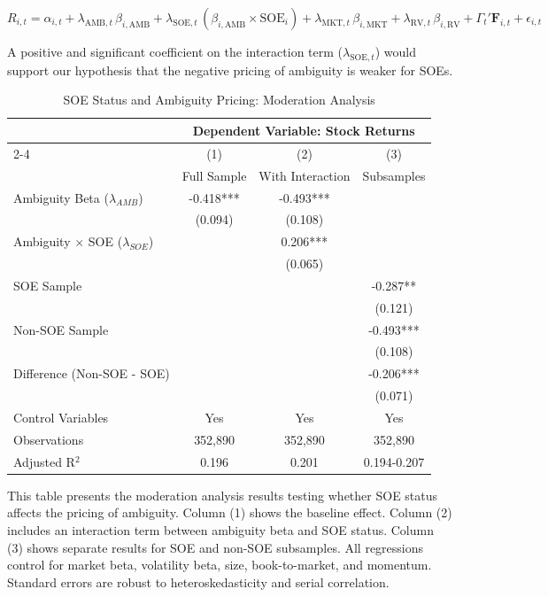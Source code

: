 \documentclass[preprint,12pt,authoryear]{elsarticle}
\begin{document}
\begin{equation}
R_{i,t} = \alpha_{i,t} + \lambda_{\text{AMB},t} \, \beta_{i,\text{AMB}} + \lambda_{\text{SOE},t} \, (\beta_{i,\text{AMB}} \times \text{SOE}_i) + \lambda_{\text{MKT},t} \, \beta_{i,\text{MKT}} + \lambda_{\text{RV},t} \, \beta_{i,\text{RV}} + \Gamma_{t}' \mathbf{F}_{i,t} + \epsilon_{i,t}
\end{equation}

A positive and significant coefficient on the interaction term ($\lambda_{\text{SOE},t}$) would support our hypothesis that the negative pricing of ambiguity is weaker for SOEs.

\begin{table}[htbp]
\centering
\caption{SOE Status and Ambiguity Pricing: Moderation Analysis}
\label{tab:soe_moderation}
\begin{threeparttable}
\begin{tabular*}{\textwidth}{@{\extracolsep{\fill}} lccc @{\extracolsep{\fill}}}
\toprule
& \multicolumn{3}{c}{Dependent Variable: Stock Returns} \\
\cmidrule(lr){2-4}
& (1) & (2) & (3) \\
& Full Sample & With Interaction & Subsamples \\
\midrule
\midrule
Ambiguity Beta ($\lambda_{AMB}$) & -0.418*** & -0.493*** &  \\
& (0.094) & (0.108) &  \\
\midrule
Ambiguity $\times$ SOE ($\lambda_{SOE}$) & & 0.206*** &  \\
& & (0.065) &  \\
\midrule
SOE Sample & & & -0.287** \\
& & & (0.121) \\
\midrule
Non-SOE Sample & & & -0.493*** \\
& & & (0.108) \\
\midrule
Difference (Non-SOE - SOE) & & & -0.206*** \\
& & & (0.071) \\
\midrule
Control Variables & Yes & Yes & Yes \\
\midrule
Observations & 352,890 & 352,890 & 352,890 \\
Adjusted R$^2$ & 0.196 & 0.201 & 0.194-0.207 \\
\bottomrule
\end{tabular*}
\begin{tablenotes}[flushleft]
\small
\item[] This table presents the moderation analysis results testing whether SOE status affects the pricing of ambiguity. Column (1) shows the baseline effect. Column (2) includes an interaction term between ambiguity beta and SOE status. Column (3) shows separate results for SOE and non-SOE subsamples. All regressions control for market beta, volatility beta, size, book-to-market, and momentum. Standard errors are robust to heteroskedasticity and serial correlation.
\end{tablenotes}
\end{threeparttable}
\end{table}
\end{document}
